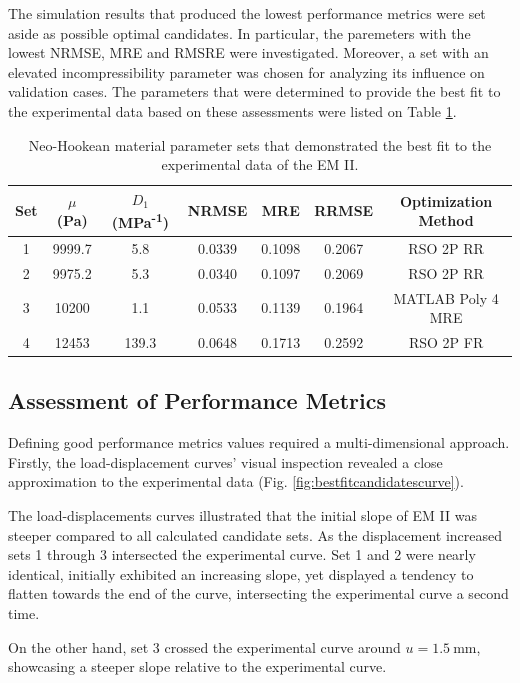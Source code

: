 The simulation results that produced the lowest performance metrics were set aside as possible
optimal candidates. In particular, the paremeters with the lowest NRMSE, MRE and RMSRE were  
investigated. Moreover, a set with an elevated incompressibility parameter was chosen for 
analyzing its influence on validation cases.
The parameters that were determined to provide the best fit to the 
experimental data based on these assessments were listed on Table \ref{tab:materialsetbestfit}.
\begin{table}[ht!]
    \centering
    \begin{tabular}{|c|c|c|c|c|c|c|}
    \hline
    Set & $\mu$ (Pa) & $D_1$ (MPa\textsuperscript{-1}) & NRMSE & MRE & RRMSE & Optimization Method\\
    \hline
    1 & 9999.7 & 5.8 & 0.0339 & 0.1098 & 0.2067 & RSO 2P RR\\
    2 & 9975.2 & 5.3 & 0.0340 & 0.1097 & 0.2069 & RSO 2P RR\\
    3 & 10200 & 1.1 & 0.0533 & 0.1139 & 0.1964 & MATLAB Poly 4 MRE\\
    4 & 12453 & 139.3 & 0.0648 & 0.1713 & 0.2592 & RSO 2P FR\\
    \hline
    \end{tabular}
    \caption[Best material parameter sets]{Neo-Hookean material parameter sets that demonstrated the best fit to the experimental data of the EM II.}
	\label{tab:materialsetbestfit}
\end{table}

\subsection*{Assessment of Performance Metrics}
Defining good performance metrics values required a multi-dimensional approach. 
Firstly, the load-displacement curves' visual inspection revealed a close approximation 
to the experimental data (Fig. \ref{fig:bestfitcandidatescurve}).

The load-displacements curves illustrated that the initial slope of EM II was steeper compared to 
all calculated candidate sets. As the displacement increased sets \SI{1}{} through \SI{3}{} intersected 
the experimental curve. Set \SI{1}{} and \SI{2}{} were nearly identical, initially exhibited an increasing 
slope, yet displayed a tendency to flatten towards the end of the curve, intersecting the experimental curve 
a second time.

On the other hand, set \SI{3}{} crossed the experimental curve around $u=\SI{1.5}{\milli \meter}$, showcasing 
a steeper slope relative to the experimental curve. 

